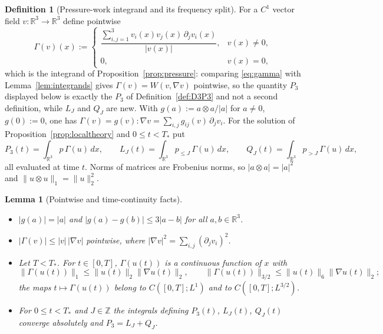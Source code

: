\documentclass[11pt]{article}
\newtheorem{lemma}[theorem]{Lemma}
\theoremstyle{definition}
\newtheorem{definition}[theorem]{Definition}
\theoremstyle{plain}
\newcommand{\R}{\mathbb R}
\newcommand{\norm}[1]{\lVert #1\rVert}
\begin{document}
\begin{definition}[Pressure-work integrand and its frequency split]
\label{def:pressure-work}
For a $C^1$ vector field $v:\R^3\to\R^3$ define pointwise
\begin{equation}\label{eq:gamma}
 \Gamma(v)(x):=
 \begin{cases}
  \dfrac{\sum_{i,j=1}^3v_i(x)v_j(x)\,\partial_jv_i(x)}{|v(x)|}, & v(x)\ne0,\\[1.2ex]
  0, & v(x)=0 ,
 \end{cases}
\end{equation}
which is the integrand of Proposition~\ref{prop:pressure}: comparing
\eqref{eq:gamma} with Lemma~\ref{lem:integrands} gives
$\Gamma(v)=W(v,\nabla v)$ pointwise, so the quantity $P_3$ displayed below is
exactly the $P_3$ of Definition~\ref{def:D3P3} and not a second definition,
while $L_J$ and $Q_J$ are new.  With
$g(a):=a\otimes a/|a|$ for $a\ne0$,
$g(0):=0$, one has $\Gamma(v)=g(v):\nabla v=\sum_{i,j}g_{ij}(v)\,\partial_jv_i$.
For the solution of Proposition~\ref{prop:localtheory} and $0\le t<T_*$ put
\[
 P_3(t)=\int_{\R^3}p\,\Gamma(u)\,dx,\qquad
 L_J(t)=\int_{\R^3}p_{\le J}\,\Gamma(u)\,dx,\qquad
 Q_J(t)=\int_{\R^3}p_{>J}\,\Gamma(u)\,dx ,
\]
all evaluated at time $t$.  Norms of matrices are Frobenius norms, so
$|a\otimes a|=|a|^2$ and $\norm{u\otimes u}_1=\norm u_2^2$.
\end{definition}

\begin{lemma}[Pointwise and time-continuity facts]\label{lem:gamma}
\begin{itemize}
\item[(a)] $|g(a)|=|a|$ and $|g(a)-g(b)|\le3|a-b|$ for all $a,b\in\R^3$.
\item[(b)] $|\Gamma(v)|\le|v|\,|\nabla v|$ pointwise, where
$|\nabla v|^2=\sum_{i,j}(\partial_jv_i)^2$.
\item[(c)] Let $T<T_*$.  For $t\in[0,T]$, $\Gamma(u(t))$ is a continuous function
of $x$ with
\[
 \norm{\Gamma(u(t))}_1\le\norm{u(t)}_2\norm{\nabla u(t)}_2,\qquad
 \norm{\Gamma(u(t))}_{3/2}\le\norm{u(t)}_6\norm{\nabla u(t)}_2 ;
\]
the maps $t\mapsto\Gamma(u(t))$ belong to $C([0,T];L^1)$ and to
$C([0,T];L^{3/2})$.
\item[(d)] For $0\le t<T_*$ and $J\in\mathbb Z$ the integrals defining
$P_3(t)$, $L_J(t)$, $Q_J(t)$ converge absolutely and $P_3=L_J+Q_J$.
\end{itemize}
\end{lemma}
\end{document}
